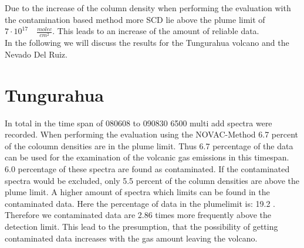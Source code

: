 \documentclass  [
  paper    = a4,
  BCOR     = 10mm,
  twoside,
  fontsize = 12pt,
  fleqn,
  toc      = bibnumbered,
  toc      = listofnumbered,
  numbers  = noendperiod,
  headings = normal,
  listof   = leveldown,
  version  = 3.03
]                                       {scrreprt}
\begin{document}
Due to the increase of the   column density when performing the evaluation with the contamination based method more   SCD lie above the plume limit of $7\cdot10^{17}\quad \frac{molec}{cm^2}$. This leads to an increase of the amount of reliable data.\\ 
In the following we will discuss the results for the Tungurahua volcano and the Nevado Del Ruiz. 



\section*{Tungurahua}
 	In total in the time span of 080608 to 090830 6500 multi add spectra were recorded. 
 	When performing the evaluation using the NOVAC-Method 6.7 percent of the   coloumn densities are in the plume limit. Thus 6.7 percentage of the data can be used for the examination of the volcanic gas emissions in this timespan.
 	6.0 percentage of these spectra are found as contaminated. If the contaminated spectra would be excluded, only 5.5 percent of the   column densities are above the plume limit. A higher amount of spectra which   limits can be found in the contaminated data. Here the percentage of data in the plumelimit is: 19.2 .
 	Therefore we contaminated data are 2.86 times more frequently above the detection limit. This lead to the presumption, that the possibility of getting contaminated data increases with the gas amount leaving the volcano.
 	
\end{document}
